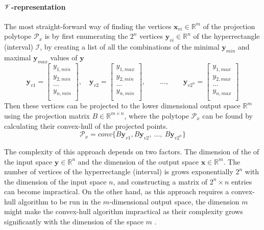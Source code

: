 \paragraph*{$\mathscr{V}$-representation} The most straight-forward way of finding the vertices $\bm{x}_{vi}\in\mathbb{R}^m$ of the projection polytope $\mathcal{P}_x$ is by first enumerating the $2^n$ vertices $\bm{y}_{vi}\in\mathbb{R}^n$ of the hyperrectangle  (interval) $\mathcal{I}$, by creating a list of all the combinations of the minimal $\bm{y}_{min}$ and maximal $\bm{y}_{max}$ values of $\bm{y}$
\begin{equation}
    \bm{y}_{v1} = \begin{bmatrix}
        y_{1,min}\\
        y_{2,min}\\
        \ldots\\
        y_{n,min}\\
    \end{bmatrix},\quad
    \bm{y}_{v2} = \begin{bmatrix}
        y_{1,max}\\
        y_{2,min}\\
        \ldots\\
        y_{n,min}\\
    \end{bmatrix},\qquad\ldots,\qquad
    \bm{y}_{v2^n} = \begin{bmatrix}
        y_{1,max}\\
        y_{2,max}\\
        \ldots\\
        y_{n,max}\\
    \end{bmatrix} 
\end{equation}
Then these vertices can be projected to the lower dimensional output space $\mathbb{R}^m$ using the projection matrix $B\in \mathbb{R}^{m\times n}$, where the polytope $\mathcal{P}_x$ can be found by calculating their convex-hull of the projected points.
\begin{equation}
    \mathcal{P}_x = conv\{B\bm{y}_{v1},B\bm{y}_{v2},~\ldots, ~ B\bm{y}_{v2^n}\}
\end{equation}

The complexity of this approach depends on two factors. The dimension of the of the input space $\bm{y} \in \mathbb{R}^n$ and the dimension of the output space $\bm{x}\in \mathbb{R}^m$. The number of vertices of the hyperrectangle (interval) is grows exponentially $2^n$ with the dimension of the input space $n$, and constructing a matrix of $2^n \times n$ entries can become impractical. On the other hand, as this approach requires a convex-hull algorithm to be run in the $m$-dimensional output space, the dimension $m$ might make the convex-hull algorithm impractical as their complexity grows significantly with the dimension of the space $m$ \cite{Barber1996}.

